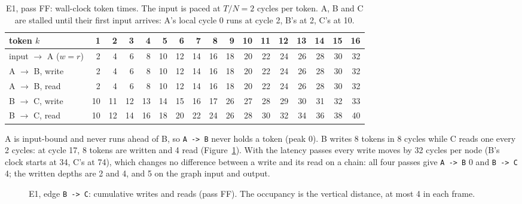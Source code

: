 \documentclass[10pt,a4paper]{article}
\newcommand{\code}[1]{\texttt{#1}}
\newcommand{\Tg}{T}           %
\newcommand{\NF}{N}            %
\begin{document}
\begin{table}[h]
\centering\small
\caption{E1, pass FF: wall-clock token times. The input is paced at $\Tg/\NF=2$
cycles per token. A, B and C are stalled until their first input arrives:
A's local cycle 0 runs at cycle 2, B's at 2, C's at 10.}\label{tab:e1}
\begin{tabular}{@{}l*{16}{r}@{}}
\toprule
token $k$ & 1&2&3&4&5&6&7&8&9&10&11&12&13&14&15&16\\
\midrule
input $\to$ A ($w=r$) & 2&4&6&8&10&12&14&16&18&20&22&24&26&28&30&32\\
A $\to$ B, write & 2&4&6&8&10&12&14&16&18&20&22&24&26&28&30&32\\
A $\to$ B, read  & 2&4&6&8&10&12&14&16&18&20&22&24&26&28&30&32\\
B $\to$ C, write & 10&11&12&13&14&15&16&17&26&27&28&29&30&31&32&33\\
B $\to$ C, read  & 10&12&14&16&18&20&22&24&26&28&30&32&34&36&38&40\\
\bottomrule
\end{tabular}
\end{table}

A is input-bound and never runs ahead of B, so \code{A -> B} never holds a token
(peak 0). B writes 8 tokens in 8 cycles while C reads one every 2 cycles: at
cycle 17, 8 tokens are written and 4 read (Figure~\ref{fig:e1}). With the latency
passes every write moves by 32 cycles per node (B's clock starts at 34, C's at
74), which changes no difference between a write and its read on a chain: all four
passes give \code{A -> B} 0 and \code{B -> C} 4; the written depths are 2 and 4,
and 5 on the graph input and output.

\begin{figure}[h]
\centering
{}
\caption{E1, edge \code{B -> C}: cumulative writes and reads (pass FF). The
occupancy is the vertical distance, at most 4 in each frame.}\label{fig:e1}
\end{figure}
\end{document}
